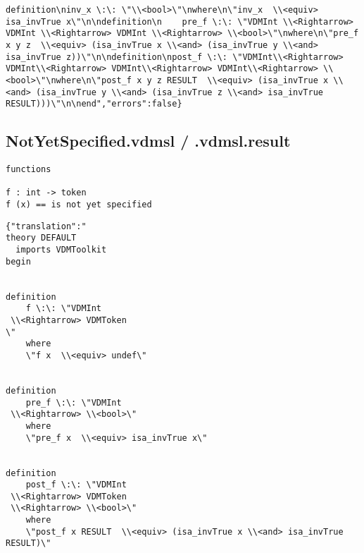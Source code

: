 \begin{appendices}
\begin{lstlisting}
definition\ninv_x \:\: \"\\<bool>\"\nwhere\n\"inv_x  \\<equiv> isa_invTrue x\"\n\ndefinition\n    pre_f \:\: \"VDMInt \\<Rightarrow> VDMInt \\<Rightarrow> VDMInt \\<Rightarrow> \\<bool>\"\nwhere\n\"pre_f x y z  \\<equiv> (isa_invTrue x \\<and> (isa_invTrue y \\<and> isa_invTrue z))\"\n\ndefinition\npost_f \:\: \"VDMInt\\<Rightarrow> VDMInt\\<Rightarrow> VDMInt\\<Rightarrow> VDMInt\\<Rightarrow> \\<bool>\"\nwhere\n\"post_f x y z RESULT  \\<equiv> (isa_invTrue x \\<and> (isa_invTrue y \\<and> (isa_invTrue z \\<and> isa_invTrue RESULT)))\"\n\nend","errors":false}
\end{lstlisting}

\subsection{NotYetSpecified.vdmsl / .vdmsl.result}
\begin{lstlisting}
functions

f : int -> token
f (x) == is not yet specified
\end{lstlisting}

\begin{lstlisting}
{"translation":"
theory DEFAULT
  imports VDMToolkit
begin


definition
    f \:\: \"VDMInt
 \\<Rightarrow> VDMToken
\"
    where
    \"f x  \\<equiv> undef\"


definition
    pre_f \:\: \"VDMInt
 \\<Rightarrow> \\<bool>\"
    where
    \"pre_f x  \\<equiv> isa_invTrue x\"


definition
    post_f \:\: \"VDMInt
 \\<Rightarrow> VDMToken
 \\<Rightarrow> \\<bool>\"
    where
    \"post_f x RESULT  \\<equiv> (isa_invTrue x \\<and> isa_invTrue RESULT)\"


\end{lstlisting}
\end{appendices}
